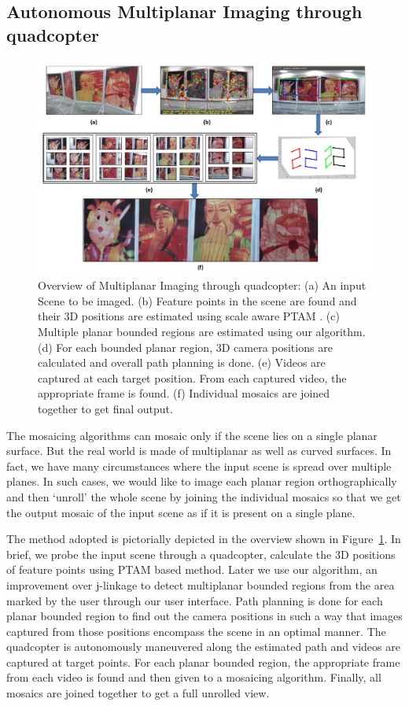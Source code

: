 \subsection{Autonomous Multiplanar Imaging through quadcopter}
\begin{figure}[h!]
\centering
\includegraphics[width=0.98\linewidth]{figures/multiplanar/workflow}
\caption[Overflow of autonomous multiplanar imaging through quadcopter]{Overview
of Multiplanar Imaging through quadcopter:
(a) An input Scene to be imaged.
(b) Feature points in the scene are found and their 3D positions are estimated
using scale aware PTAM \cite{Engel12}. (c) Multiple planar bounded regions are
estimated using our algorithm. (d) For each bounded planar region, 3D camera
positions are calculated and overall path planning is done. (e) Videos are
captured at each target position. From each captured video, the appropriate
frame is found. (f) Individual mosaics are joined together to get final output.}
\label{fig:multiplanar_workflow}
\end{figure}

The mosaicing algorithms can mosaic only if the scene lies on a single planar
surface. But the real world is made of multiplanar as well as curved surfaces.
In fact, we have many circumstances where the input scene is spread over
multiple planes. In such cases, we would like to image each planar region
orthographically and then `unroll' the whole scene by joining the individual
mosaics so that we get the output mosaic of the input scene as if it is present
on a single plane.

The method adopted is pictorially depicted in the overview shown in
Figure~\ref{fig:multiplanar_workflow}. In brief, we probe the input scene through a quadcopter, calculate the 3D positions of feature points
using PTAM based method\cite{engel}. Later we use our algorithm, an improvement
over j-linkage\cite{jlinkage} to detect multiplanar bounded regions from the area
marked by the user through our user interface. Path planning is done for each
planar bounded region to find out the camera positions in such a way
that images captured from those positions encompass the scene in an optimal manner.
The quadcopter is autonomously maneuvered along the estimated path and videos
are captured at target points. For each planar bounded region, the appropriate
frame from each video is found and then given to a mosaicing algorithm. 
Finally, all mosaics are joined together to get a full unrolled view.

